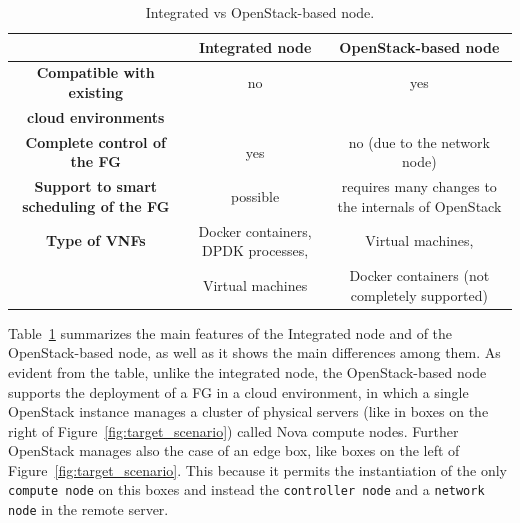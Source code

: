 {\begin{table}[tb]
	\caption{Integrated vs OpenStack-based node.}
	\label{tab:features}
	\begin{tabular}{c||c|c|}
		& Integrated node & OpenStack-based node \\
		\hline	
		\textbf{Compatible with existing} & no  &  yes \\	
		\textbf{cloud environments} &  &  \\	
		\hline
		\textbf{Complete control of the FG} & yes & no (due to the network node) \\
		\hline
		\textbf{Support to smart scheduling of the FG} & possible & requires many changes to the internals of OpenStack \\
		\hline
		\textbf{Type of VNFs} & Docker containers, DPDK processes,  & Virtual machines, \\
		& Virtual machines &  Docker containers (not completely supported)\\
		\hline
	\end{tabular}
\end{table}
Table~\ref{tab:features} summarizes the main features of the Integrated node and of the OpenStack-based node, as well as it shows the main differences among them.  
As evident from the table, unlike the integrated node, the OpenStack-based node supports the deployment of a FG in a cloud environment, in which a single OpenStack instance manages a cluster of physical servers (like in boxes on the right of Figure~\ref{fig:target_scenario}) called Nova compute nodes. Further OpenStack manages also the case of an edge box, like boxes on the left of Figure~\ref{fig:target_scenario}. This because it permits the instantiation of the only \texttt{compute node} on this boxes and instead the \texttt{controller node} and a \texttt{network node} in the remote server.

}
